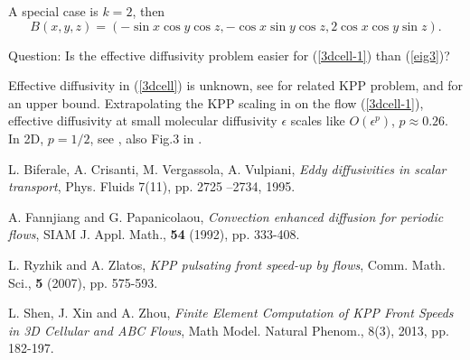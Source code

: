 \documentclass{article}
\newcommand{\be}{\begin{equation}}
\newcommand{\ee}{\end{equation}}
\newcommand{\0}{\mathbf{0}}
\newcommand{\1}{\mathbf{1}}
\newcommand{\2}{\mathbf{2}}
\newcommand{\3}{\mathbf{3}}
\newcommand{\4}{\mathbf{4}}
\newcommand{\5}{\mathbf{5}}
\newcommand{\6}{\mathbf{6}}
\newcommand{\7}{\mathbf{7}}
\newcommand{\8}{\mathbf{8}}
\begin{document}
A special case is $k=2$, then
\be
B(x,y,z) =
(-\sin{x}\cos{y}\cos{z},-\cos{x}\sin{y}\cos{z},2\cos{x}\cos{y}\sin{z}).\label{3dcell-1}
\ee
\medskip

Question: Is the effective diffusivity problem easier for (\ref{3dcell-1}) than (\ref{eig3})? 
\medskip

Effective diffusivity in (\ref{3dcell}) is unknown, see \cite{SXZ_13} for 
related KPP problem, and \cite{RZ_07} for an upper bound. Extrapolating the KPP scaling in \cite{SXZ_13} on 
the flow (\ref{3dcell-1}), effective diffusivity at small molecular diffusivity $\epsilon$ scales like $O(\epsilon^{p})$, $p \approx 0.26$. 
In 2D, $p=1/2$, see \cite{fannjiang}, also Fig.3 in \cite{Biferale_95}.    


\begin{thebibliography}{99}

L. Biferale, A. Crisanti, M. Vergassola, A. Vulpiani,
{\em Eddy diffusivities in scalar transport}, Phys. Fluids 7(11), pp. 2725 --2734, 1995.

 A. Fannjiang and G. Papanicolaou,
{\em Convection enhanced diffusion for periodic flows}, SIAM J.
Appl. Math., {\bf 54} (1992), pp. 333-408.

L. Ryzhik and A. Zlatos,
{\em KPP pulsating front speed-up by flows}, Comm. Math. Sci., {\bf
5} (2007), pp. 575-593.

L. Shen, J. Xin and A. Zhou, {\em Finite Element Computation of KPP
Front Speeds in 3D Cellular and ABC Flows}, Math Model. Natural Phenom., 8(3), 2013, pp. 182-197. 




\end{thebibliography}
\end{document}
